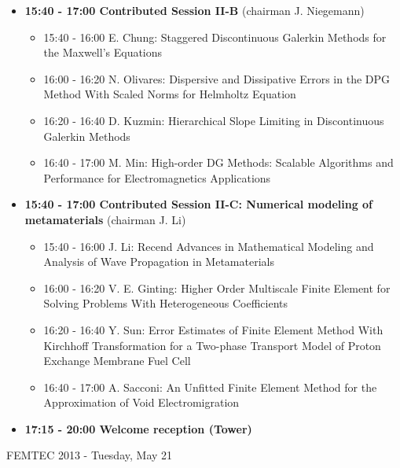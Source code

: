 \documentclass[10pt]{article}%
\begin{document}
\begin{itemize}
\begin{itemize}
  \end{itemize}
  \item {\bf 15:40 - 17:00 Contributed Session II-B} (chairman J. Niegemann) 
  \begin{itemize}
    \item 15:40 - 16:00 {E. Chung}: {Staggered Discontinuous Galerkin Methods for the Maxwell's Equations}
    \item 16:00 - 16:20 {N. Olivares}: {Dispersive and Dissipative Errors in the DPG Method With Scaled Norms for Helmholtz Equation}
    \item 16:20 - 16:40 {D. Kuzmin}: {Hierarchical Slope Limiting in Discontinuous Galerkin Methods}
    \item 16:40 - 17:00 {M. Min}: {High-order DG Methods: Scalable Algorithms and Performance for Electromagnetics Applications}
  \end{itemize}
    \item {\bf 15:40 - 17:00 Contributed Session II-C: Numerical modeling of metamaterials} (chairman J. Li) 
  \begin{itemize}
    \item 15:40 - 16:00 {J. Li}: {Recend Advances in Mathematical Modeling and Analysis of Wave Propagation in Metamaterials} %
    \item 16:00 - 16:20 {V. E. Ginting}: {Higher Order Multiscale Finite Element for Solving Problems With Heterogeneous Coefficients}
    \item 16:20 - 16:40 {Y. Sun}: Error Estimates of Finite Element Method With Kirchhoff Transformation for a Two-phase Transport Model of Proton Exchange Membrane Fuel Cell
    \item 16:40 - 17:00 {A. Sacconi}: {An Unfitted Finite Element Method for the Approximation of Void Electromigration}
  \end{itemize}    
  \item {\bf 17:15 - 20:00 Welcome reception (Tower)} 
\end{itemize}

\newpage

\centerline{\huge FEMTEC 2013 - Tuesday, May 21}
\vspace{4mm}
\end{document}
